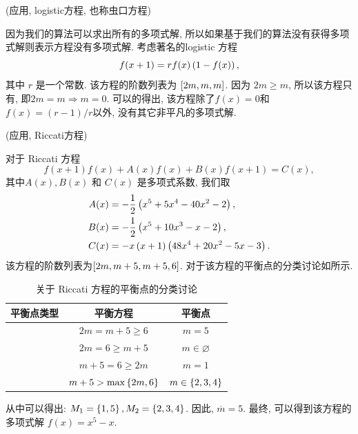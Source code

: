 \begin{example}
(应用, logistic方程, 也称虫口方程)

因为我们的算法可以求出所有的多项式解, 所以如果基于我们的算法没有获得多项式解则表示方程没有多项式解. 考虑著名的logistic 方程\cite{may1976simple}
\begin{equation}
    f(x+1)=r f(x)\left(1-f(x)\right),
\end{equation}
其中 $r$ 是一个常数. 该方程的阶数列表为 $\left[2m,m,m\right]$. 因为 $2m\ge m$, 所以该方程只有\BPone{}, 即$2m=m\Rightarrow m=0$. 可以的得出, 该方程除了$f(x)=0$和$f(x)=(r-1)/r$以外, 没有其它非平凡的多项式解.
\end{example}

\begin{example}
(应用, Riccati方程)

对于 Riccati 方程\cite{bittanti2012riccati}
\begin{equation}
    f(x+1)f(x)+A(x)f(x)+B(x)f(x+1)=C(x), \label{raeq}
\end{equation} 
其中$A(x),B(x)$ 和 $C(x)$ 是多项式系数, 我们取 
\begin{equation}
\begin{split}
A(x)&= -\frac{1}{2}\left(x^5+5x^4-40x^2-2\right), \\ 
B(x)&= -\frac{1}{2}\left(x^5+10x^3-x-2\right), \\ 
C(x)&= -x\left(x+1\right)\left(48x^4+20x^2-5x-3\right).
\end{split}
\end{equation}
该方程的阶数列表为$\left[2m,m+5,m+5,6\right]$. 对于该方程的平衡点的分类讨论如所示.

\begin{table}[htbp]
\centering
\caption{关于 Riccati 方程的平衡点的分类讨论}\label{tb}
\begin{tabular}{ccc}
\hline
平衡点类型 & 平衡方程 & 平衡点  \\ 
\hline
\BPone{}  & $2m=m+5\ge 6$            & $m=5$             \\ 
\BPone{}  & $2m=6\ge m+5$            & $m\in \varnothing$             \\ 
\BPone{}  & $m+5=6\ge 2m$            & $m=1$             \\ 
\BPtwo{}  & $m+5>\max\left\{2m,6\right\}$  & $m\in \left\{2,3,4\right\}$ \\
\hline
\end{tabular}
\end{table}
从中可以得出: $M_1=\left\{1,5\right\},M_2=\left\{2,3,4\right\}$. 因此, $\overline m=5$. 最终, 可以得到该方程的多项式解 $f(x)=x^5-x$. 


\end{example}
